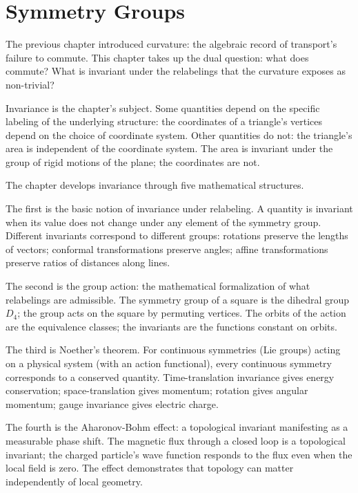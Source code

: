 \chapter{Symmetry Groups}
\label{chap:symmetry-groups}


\begin{chapteressay}

The previous chapter introduced curvature: the algebraic record of
transport's failure to commute. This chapter takes up the dual
question: what does commute? What is invariant under the
relabelings that the curvature exposes as non-trivial?

Invariance is the chapter's subject. Some quantities depend on the
specific labeling of the underlying structure: the coordinates of
a triangle's vertices depend on the choice of coordinate system.
Other quantities do not: the triangle's area is independent of the
coordinate system. The area is invariant under the group of
rigid motions of the plane; the coordinates are not.

The chapter develops invariance through five mathematical
structures.

The first is the basic notion of invariance under relabeling. A
quantity is invariant when its value does not change under any
element of the symmetry group. Different invariants correspond
to different groups: rotations preserve the lengths of vectors;
conformal transformations preserve angles; affine transformations
preserve ratios of distances along lines.

The second is the group action: the mathematical formalization of
what relabelings are admissible. The symmetry group of a square is
the dihedral group $D_4$; the group acts on the square by
permuting vertices. The orbits of the action are the equivalence
classes; the invariants are the functions constant on orbits.

The third is Noether's theorem. For continuous symmetries (Lie
groups) acting on a physical system (with an action functional),
every continuous symmetry corresponds to a conserved quantity.
Time-translation invariance gives energy conservation;
space-translation gives momentum; rotation gives angular
momentum; gauge invariance gives electric charge.

The fourth is the Aharonov-Bohm effect: a topological invariant
manifesting as a measurable phase shift. The magnetic flux
through a closed loop is a topological invariant; the charged
particle's wave function responds to the flux even when the
local field is zero. The effect demonstrates that topology can
matter independently of local geometry.


\end{chapteressay}

